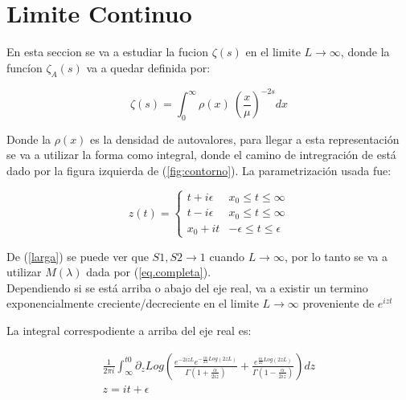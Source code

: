 \chapter{Limite Continuo}

En esta seccion se va a estudiar la fucion $\zeta (s) $ en el limite $L \rightarrow \infty$, donde la funcíon $\zeta _A (s)$ va a quedar definida por:

\begin{equation}
\zeta (s) = \int _{0} ^{\infty} \rho (x) \ \left( \frac{x}{\mu } \right) ^{-2 s} dx
\end{equation}

Donde la $\rho(x) $ es la densidad de autovalores, para llegar a esta representación se va a utilizar la forma como integral, donde el camino de intregración de está dado por la figura izquierda de (\ref{fig:contorno}). La parametrización usada fue:


\[
z(t) =  
	  \begin{cases} 
      t + i \epsilon  & x _0 \leq t \leq \infty \\
      t - i \epsilon  & x _0 \leq t \leq \infty \\
      x _0 + i t		  & - \epsilon \leq t \leq \epsilon
   \end{cases}
\]

De (\ref{larga}) se puede ver que $S1,S2 \rightarrow 1$ cuando $L \rightarrow \infty$, por lo tanto se va a utilizar $M ( \lambda)$ dada por (\ref{eq.completa}).\\



Dependiendo si se está arriba o abajo del eje real, va a existir un termino exponencialmente creciente/decreciente en el limite $L \rightarrow \infty$ proveniente de $e ^{i z t}$

La integral correspodiente a arriba del eje real es:

\begin{equation}
\begin{array}{c}
\frac{1}{2 \pi i} \int _{\infty} ^{t0} 
\partial _z
Log
\left(
\frac{e ^{-2 i z  L } e ^{- \frac{i \alpha}{2 \lambda} Log \left( 2 z  L \right) } }
	 {\Gamma \left( 1 + \frac{ \alpha}{2 i z } \right)} +
\frac{e ^{ \frac{i \alpha}{2 z } Log \left( 2 z  L \right)  } }{\Gamma \left( 1 - \frac{ \alpha}{2 i z } \right) }
\right) d z \\
z = i t + \epsilon 
\end{array}
\end{equation}

